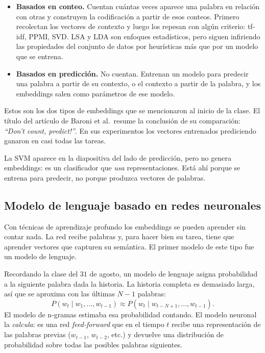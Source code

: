 \documentclass[11pt,letterpaper]{article}
\begin{document}
\begin{itemize}[itemsep=0.3em]
    \item \textbf{Basados en conteo.} Cuentan cuántas veces aparece
          una palabra en relación con otras y construyen la
          codificación a partir de esos conteos. Primero recolectan
          los vectores de contexto y luego los repesan con algún
          criterio: tf-idf, PPMI, SVD. LSA y LDA son enfoques
          estadísticos, pero siguen infiriendo las propiedades del
          conjunto de datos por heurísticas más que por un modelo que
          se entrena.
    \item \textbf{Basados en predicción.} No cuentan. Entrenan un
          modelo para predecir una palabra a partir de su contexto, o
          el contexto a partir de la palabra, y los embeddings salen
          como parámetros de ese modelo.
\end{itemize}

Estos son los dos tipos de embeddings que se mencionaron al inicio de
la clase. El título del artículo de Baroni et al.\ resume la
conclusión de su comparación: \textit{``Don't count, predict!''}. En
sus experimentos los vectores entrenados prediciendo ganaron en casi
todas las tareas.

\begin{ojo}
    La SVM aparece en la diapositiva del lado de predicción, pero no
    genera embeddings: es un clasificador que \emph{usa}
    representaciones. Está ahí porque se entrena para predecir, no
    porque produzca vectores de palabras.
\end{ojo}


\subsection*{Modelo de lenguaje basado en redes neuronales}

Con técnicas de aprendizaje profundo los embeddings se pueden aprender
sin contar nada. La red recibe palabras y, para hacer bien su tarea,
tiene que aprender vectores que capturen su semántica. El primer
modelo de este tipo fue un modelo de lenguaje.

Recordando la clase del $31$ de agosto, un modelo de lenguaje asigna
probabilidad a la siguiente palabra dada la historia. La historia
completa es demasiado larga, así que se aproxima con las últimas
$N - 1$ palabras:
\[
    P(w_t \mid w_1, \ldots, w_{t-1})
    \approx P(w_t \mid w_{t-N+1}, \ldots, w_{t-1}) .
\]
El modelo de n-gramas estimaba esa probabilidad contando. El modelo
neuronal la \emph{calcula}: es una red \textit{feed-forward} que en el
tiempo $t$ recibe una representación de las palabras previas
($w_{t-1}$, $w_{t-2}$, etc.) y devuelve una distribución de
probabilidad sobre todas las posibles palabras siguientes.
\end{document}

